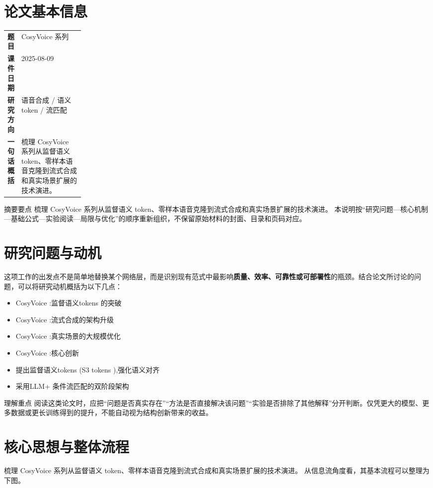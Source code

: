 \documentclass[UTF8,11pt,a4paper]{ctexart}
\newcommand{\term}[1]{\textbf{\textcolor{mainblue}{#1}}}
\begin{document}
\section{论文基本信息}
\begin{center}
\begin{tabularx}{0.94\linewidth}{>{\bfseries}p{0.18\linewidth}X}
\toprule
题目 & CosyVoice 系列\\
课件日期 & 2025-08-09\\
研究方向 & 语音合成 / 语义 token / 流匹配\\
一句话概括 & 梳理 CosyVoice 系列从监督语义 token、零样本语音克隆到流式合成和真实场景扩展的技术演进。\\
\bottomrule
\end{tabularx}
\end{center}

\begin{infobox}{摘要要点}
梳理 CosyVoice 系列从监督语义 token、零样本语音克隆到流式合成和真实场景扩展的技术演进。 本说明按“研究问题—核心机制—基础公式—实验阅读—局限与优化”的顺序重新组织，不保留原始材料的封面、目录和页码对应。
\end{infobox}

\section{研究问题与动机}
这项工作的出发点不是简单地替换某个网络层，而是识别现有范式中最影响\term{质量、效率、可靠性或可部署性}的瓶颈。结合论文所讨论的问题，可以将研究动机概括为以下几点：
\begin{itemize}
\item CosyVoice :监督语义tokens 的突破
\item CosyVoice :流式合成的架构升级
\item CosyVoice :真实场景的大规模优化
\item CosyVoice :核心创新
\item 提出监督语义tokens (S3 tokens ),强化语义对齐
\item 采用LLM+ 条件流匹配的双阶段架构
\end{itemize}

\begin{notebox}{理解重点}
阅读这类论文时，应把“问题是否真实存在”“方法是否直接解决该问题”“实验是否排除了其他解释”分开判断。仅凭更大的模型、更多数据或更长训练得到的提升，不能自动视为结构创新带来的收益。
\end{notebox}

\section{核心思想与整体流程}
梳理 CosyVoice 系列从监督语义 token、零样本语音克隆到流式合成和真实场景扩展的技术演进。 从信息流角度看，其基本流程可以整理为下图。
\end{document}

